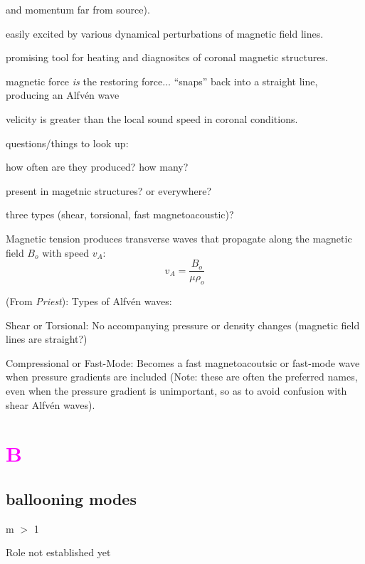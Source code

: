 \documentclass[12pt]{article}
\begin{document}
\begin{itemize*}
        and momentum far from source).
    \item easily excited by various dynamical perturbations of magnetic field
        lines.
    \item promising tool for heating and diagnositcs of
        coronal magnetic structures.
    \item magnetic force \emph{is} the restoring force$\ldots$ ``snaps'' back
        into a straight line, producing an Alfv\'en wave
    \item velicity is greater than the local sound speed in coronal conditions.
    \item questions/things to look up:
        \begin{itemize*}
            \item how often are they produced? how many?
            \item present in magetnic structures? or everywhere?
            \item three types (shear, torsional, fast magnetoacoustic)?
        \end{itemize*}
    \item Magnetic tension produces transverse waves that propagate
        along the magnetic field $B_{o}$ with speed $v_{A}$:
        $$ v_{A} = \frac{B_o}{\mu\rho_o} $$
    \item (From \emph{Priest}): Types of Alfv\'en waves:
        \begin{itemize*}
            \item Shear or Torsional: No accompanying pressure or
            density changes (magnetic field lines are straight?)
            \item Compressional or Fast-Mode: Becomes a fast
            magnetoacoutsic or fast-mode wave when pressure gradients
            are included (Note: these are often the preferred names,
            even when the pressure gradient is unimportant, so as to
            avoid confusion with shear Alfv\'en waves). 
        \end{itemize*}
\end{itemize*}

\section*{\textcolor{magenta}{B}}

\subsection*{ballooning modes}
\begin{itemize*}
    \item m $>$ 1
    \item Role not established yet
\end{itemize*}
\end{document}
